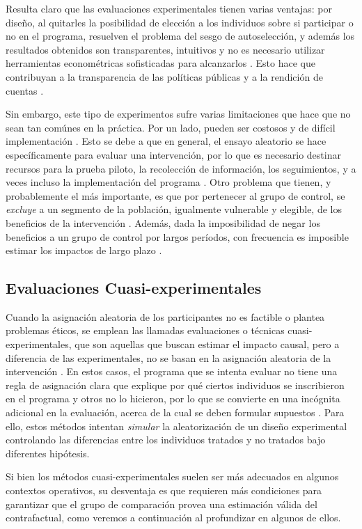 \documentclass[../../main.tex]{subfiles}
\begin{document}
Resulta claro que las evaluaciones experimentales tienen varias ventajas: por diseño, al
quitarles la posibilidad de elección a los individuos sobre si participar o no en el
programa, resuelven el problema del sesgo de autoselección, y además los resultados obtenidos
son transparentes, intuitivos y no es necesario utilizar herramientas econométricas
sofisticadas para alcanzarlos \cite{bernal}. Esto hace que contribuyan a la transparencia
de las políticas públicas y a la rendición de cuentas \cite{bernal}.

Sin embargo, este tipo de experimentos sufre varias limitaciones que hace que no sean tan
comúnes en la práctica. Por un lado, pueden ser costosos y de difícil implementación
\cite{bernal}. Esto se debe a que en general, el ensayo aleatorio se hace específicamente
para evaluar una intervención, por lo que es necesario destinar recursos para la prueba
piloto, la recolección de información, los seguimientos, y a veces incluso la
implementación del programa \cite{bernal}. Otro problema que tienen, y probablemente el
más importante, es que por pertenecer al grupo de control, se \textit{excluye} a un
segmento de la población, igualmente vulnerable y elegible, de los beneficios de la
intervención \cite{bernal}. Además, dada la imposibilidad de negar los beneficios a un
grupo de control por largos períodos, con frecuencia es imposible estimar los impactos de
largo plazo \cite{bernal}.

\subsection{Evaluaciones Cuasi-experimentales}
Cuando la asignación aleatoria de los participantes no es factible o plantea problemas
éticos, se emplean las llamadas evaluaciones o técnicas cuasi-experimentales, que son
aquellas que buscan estimar el impacto causal, pero a diferencia de las experimentales, no
se basan en la asignación aleatoria de la intervención \cite{gertler-2016}. En estos
casos, el programa que se intenta evaluar no tiene una regla de asignación clara que
explique por qué ciertos individuos se inscribieron en el programa y otros no lo hicieron,
por lo que se convierte en una incógnita adicional en la evaluación, acerca de la cual se
deben formular supuestos \cite{gertler-2016}. Para ello, estos métodos intentan
\textit{simular} la aleatorización de un diseño experimental controlando las diferencias
entre los individuos tratados y no tratados bajo diferentes hipótesis.

Si bien los métodos cuasi-experimentales suelen ser más adecuados en algunos contextos
operativos, su desventaja es que requieren más condiciones para garantizar que el grupo de
comparación provea una estimación válida del contrafactual, como veremos a continuación al
profundizar en algunos de ellos.
\end{document}
